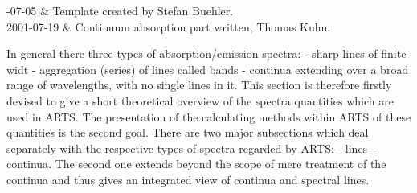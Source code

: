 %
%
 \label{sec:absorption}


%
%
-07-05 & Template created by Stefan Buehler.\\
  2001-07-19 & Continuum absorption part written, Thomas Kuhn.\\
\stophistory
%
%
%

In general there three types of absorption/emission spectra:
- sharp lines of finite widt
- aggregation (series) of lines called bands
- continua extending over a broad range of wavelengths, with
  no single lines in it.
This section is therefore firstly devised to give a short theoretical
overview of the spectra quantities which are used in ARTS. The presentation
of the calculating methods within ARTS of these quantities is the
second goal.
There are two major subsections which deal separately with the respective types
of spectra regarded by ARTS: 
- lines 
- continua.
The second one extends beyond the scope of mere treatment of the
continua and thus gives an integrated view of continua and spectral lines.

